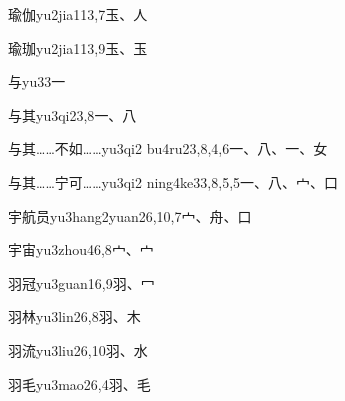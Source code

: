 \begin{entry}{瑜伽}{yu2jia1}{13,7}{⽟、⼈}
\end{entry}

\begin{entry}{瑜珈}{yu2jia1}{13,9}{⽟、⽟}
\end{entry}

\begin{entry}{与}{yu3}{3}{⼀}
\end{entry}

\begin{entry}{与其}{yu3qi2}{3,8}{⼀、⼋}
\end{entry}

\begin{entry}{与其……不如……}{yu3qi2 bu4ru2}{3,8,4,6}{⼀、⼋、⼀、⼥}
\end{entry}

\begin{entry}{与其……宁可……}{yu3qi2 ning4ke3}{3,8,5,5}{⼀、⼋、⼧、⼝}
\end{entry}

\begin{entry}{宇航员}{yu3hang2yuan2}{6,10,7}{⼧、⾈、⼝}
\end{entry}

\begin{entry}{宇宙}{yu3zhou4}{6,8}{⼧、⼧}
\end{entry}

\begin{entry}{羽冠}{yu3guan1}{6,9}{⽻、⼍}
\end{entry}

\begin{entry}{羽林}{yu3lin2}{6,8}{⽻、⽊}
\end{entry}

\begin{entry}{羽流}{yu3liu2}{6,10}{⽻、⽔}
\end{entry}

\begin{entry}{羽毛}{yu3mao2}{6,4}{⽻、⽑}
\end{entry}

